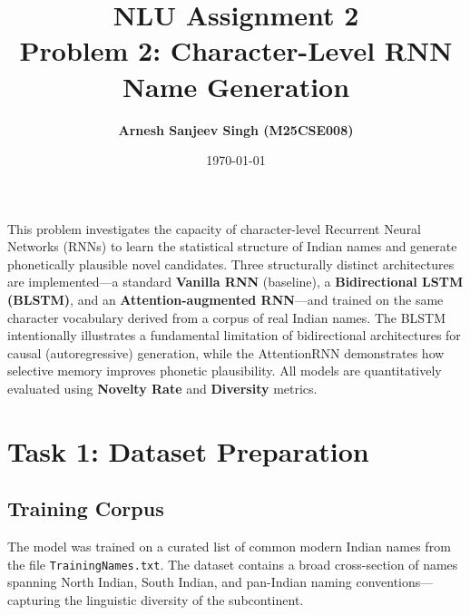 \documentclass[11pt,a4paper]{article}
\title{\Huge\textbf{\color{iitjblue} NLU Assignment 2}\\[0.5em]
       \LARGE\color{iitjblue!80} Problem 2: Character-Level RNN Name Generation}
\author{\Large\textbf{Arnesh Sanjeev Singh (M25CSE008)}}
\date{\large \today}
\begin{document}
\maketitle
\vspace{1em}

\onehalfspacing
\justifying

\begin{infoBox}
This problem investigates the capacity of character-level Recurrent Neural Networks (RNNs) to learn the statistical structure of Indian names and generate phonetically plausible novel candidates. Three structurally distinct architectures are implemented—a standard \textbf{Vanilla RNN} (baseline), a \textbf{Bidirectional LSTM (BLSTM)}, and an \textbf{Attention-augmented RNN}—and trained on the same character vocabulary derived from a corpus of real Indian names. The BLSTM intentionally illustrates a fundamental limitation of bidirectional architectures for causal (autoregressive) generation, while the AttentionRNN demonstrates how selective memory improves phonetic plausibility. All models are quantitatively evaluated using \textbf{Novelty Rate} and \textbf{Diversity} metrics.
\end{infoBox}

\vspace{1em}

\section{Task 1: Dataset Preparation}

\subsection{Training Corpus}
The model was trained on a curated list of common modern Indian names from the file \texttt{TrainingNames.txt}. The dataset contains a broad cross-section of names spanning North Indian, South Indian, and pan-Indian naming conventions—capturing the linguistic diversity of the subcontinent.
\end{document}
